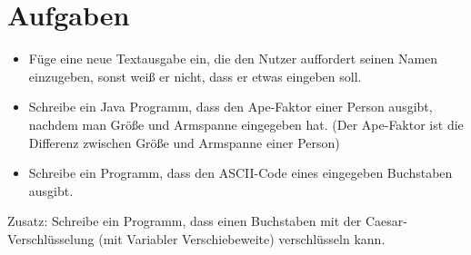 \section {Aufgaben}
\begin{itemize}
\item Füge eine neue Textausgabe ein, die den Nutzer auffordert seinen Namen einzugeben, sonst weiß er nicht, dass er etwas eingeben soll.
\item Schreibe ein Java Programm, dass den Ape-Faktor einer Person ausgibt, nachdem man Größe und Armspanne eingegeben hat. (Der Ape-Faktor ist die Differenz zwischen Größe und Armspanne einer Person)
\item Schreibe ein Programm, dass den ASCII-Code eines eingegeben Buchstaben ausgibt.
\end{itemize}

Zusatz: Schreibe ein Programm, dass einen Buchstaben mit der Caesar-Verschlüsselung (mit Variabler Verschiebeweite) verschlüsseln kann.
